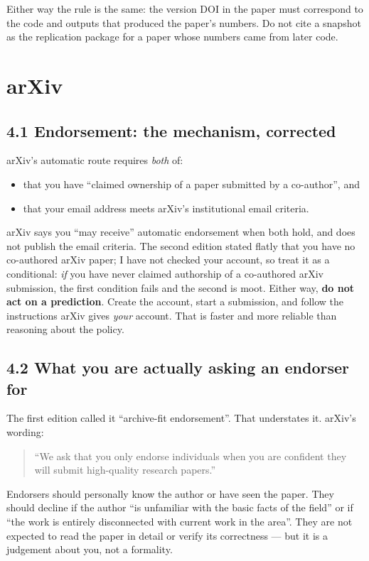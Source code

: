 \documentclass[11pt]{article}
\begin{document}
Either way the rule is the same: the version DOI in the paper must correspond to the code
and outputs that produced the paper's numbers. Do not cite a snapshot as the replication
package for a paper whose numbers came from later code.

\section{arXiv}

\subsection*{4.1 Endorsement: the mechanism, corrected}

arXiv's automatic route requires \emph{both} of:

\begin{itemize}[nosep]
\item that you have ``claimed ownership of a paper submitted by a co-author'', and
\item that your email address meets arXiv's institutional email criteria.
\end{itemize}

arXiv says you ``may receive'' automatic endorsement when both hold, and does not publish
the email criteria. The second edition stated flatly that you have no co-authored arXiv
paper; I have not checked your account, so treat it as a conditional: \emph{if} you have
never claimed authorship of a co-authored arXiv submission, the first condition fails and
the second is moot. Either way, \textbf{do not act on a prediction}. Create the account,
start a submission, and follow the instructions arXiv gives \emph{your} account. That is
faster and more reliable than reasoning about the policy.

\subsection*{4.2 What you are actually asking an endorser for}

The first edition called it ``archive-fit endorsement''. That understates it. arXiv's
wording:

\begin{quote}
``We ask that you only endorse individuals when you are confident they will submit
high-quality research papers.''
\end{quote}

Endorsers should personally know the author or have seen the paper. They should decline if
the author ``is unfamiliar with the basic facts of the field'' or if ``the work is entirely
disconnected with current work in the area''. They are not expected to read the paper in
detail or verify its correctness --- but it is a judgement about you, not a formality.
\end{document}
